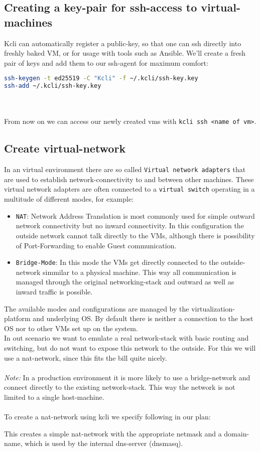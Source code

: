 \subsection{Creating a key-pair for ssh-access to virtual-machines}
Kcli can automatically register a public-key, so that one can ssh directly into freshly baked VM, or for usage with tools such as Ansible.
We'll create a fresh pair of keys and add them to our ssh-agent for maximum comfort:
\begin{lstlisting}[language=bash,caption=Create SSH-Keypair for Kcli] 
ssh-keygen -t ed25519 -C "Kcli" -f ~/.kcli/ssh-key.key
ssh-add ~/.kcli/ssh-key.key
\end{lstlisting}
\\\\
From now on we can access our newly created vms with \texttt{kcli ssh <name of vm>}.

\subsection{Create virtual-network}
In an virtual environment there are so called \texttt{Virtual network adapters} that are used to establish network-connectivity to and between other machines. These virtual network adapters are often connected to a \texttt{virtual switch} operating in a multitude of different modes, for example:
\begin{itemize}
	\item \texttt{NAT}: Network Address Translation is most commonly used for simple outward network connectivity but no inward connectivity. In this configuration the outside network cannot talk directly to the VMs, although there is possibility of Port-Forwarding to enable Guest communication.
	\item \texttt{Bridge-Mode}: In this mode the VMs get directly connected to the outside-network simmilar to a physical machine. This way all communication is managed through the original networking-stack and outward as well as inward traffic is possible.
\end{itemize}
The available modes and configurations are managed by the virtualization-platform and underlying OS.
By default there is neither a connection to the host OS nor to other VMs set up on the system.
\\
In out scenario we want to emulate a real network-stack with basic routing and switching, but do not want to expose this network to the outside. For this we will use a nat-network, since this fits the bill quite nicely.
\\\\
\textit{Note:} In a production environment it is more likely to use a bridge-network and connect directly to the existing network-stack. This way the network is not limited to a single host-machine.
\\\\
To create a nat-network using kcli we specify following in our plan:

This creates a simple nat-network with the appropriate netmask and a domain-name, which is used by the internal dns-server (dnsmasq).
